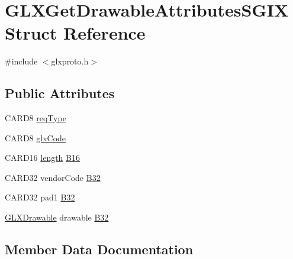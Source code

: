 \hypertarget{struct_g_l_x_get_drawable_attributes_s_g_i_x}{}\section{G\+L\+X\+Get\+Drawable\+Attributes\+S\+G\+IX Struct Reference}
\label{struct_g_l_x_get_drawable_attributes_s_g_i_x}


{\ttfamily \#include $<$glxproto.\+h$>$}

\subsection*{Public Attributes}
\begin{DoxyCompactItemize}
\item 
C\+A\+R\+D8 \hyperlink{struct_g_l_x_get_drawable_attributes_s_g_i_x_ac75c089be4fc837eda7b4acf5fdaaa64}{req\+Type}
\item 
C\+A\+R\+D8 \hyperlink{struct_g_l_x_get_drawable_attributes_s_g_i_x_a416629c2f77c72eeb0403b33903d9650}{glx\+Code}
\item 
C\+A\+R\+D16 \hyperlink{glcorearb_8h_ab9c919755bde3b34349e23a32b4e0fa7}{length} \hyperlink{struct_g_l_x_get_drawable_attributes_s_g_i_x_af2abcd401056017a3d650263c9d838d4}{B16}
\item 
C\+A\+R\+D32 vendor\+Code \hyperlink{struct_g_l_x_get_drawable_attributes_s_g_i_x_a76a029eca981472e2141291e47cc83b1}{B32}
\item 
C\+A\+R\+D32 pad1 \hyperlink{struct_g_l_x_get_drawable_attributes_s_g_i_x_a95fa319b505230094906b82a9b97c6f3}{B32}
\item 
\hyperlink{glx_8h_a826f51745d9d6c81bdbac47ae2b80cf7}{G\+L\+X\+Drawable} drawable \hyperlink{struct_g_l_x_get_drawable_attributes_s_g_i_x_aad29ceb09d7963bb7ddefcc4d83553e2}{B32}
\end{DoxyCompactItemize}


\subsection{Member Data Documentation}
\mbox{\label{struct_g_l_x_get_drawable_attributes_s_g_i_x_af2abcd401056017a3d650263c9d838d4}} 
